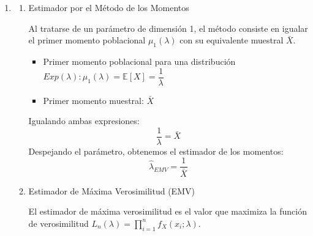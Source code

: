 \begin{enumerate}[label=\color{red}\textbf{\arabic*)}]
\begin{enumerate}[label=\color{red}\textbf{\alph*)}]
\begin{enumerate}[label=\arabic*)]
			                  El error cuadrático medio se define como la función $\mathbb{E}_p[(\hat{p}-p)^2] $. Para facilitar el cálculo, el ECM se puede descomponer como $\mathrm{Var}(\hat{p})+[\mathrm{sesgo}(\hat{p})]^2$.

			                  Como acabamos de Demostrar que el sesgo es 0: \[
				                  ECM(\hat{p})=\mathrm{Var}(\hat{p})=\mathrm{Var}(\bar{X})
			                  \]
			                  Desarrollamos la varianza: \[
				                  \mathrm{Var}(\bar{X})=\mathrm{Var}\left( \dfrac{1}{n} \sum_{i=1}^{n} X_i \right) =\dfrac{1}{n^2} \sum_{i=1}^{n} \mathrm{Var}(X_i)
			                  \]
			                  La varianza poblacional de una distribución de Bernoulli es $p(1-p)$. Sustituyendo este valor: \[
				                  ECM(\hat{p})=\dfrac{1}{n^2}(n\cdot p(1-p))=\dfrac{p(1-p)}{n}
			                  \]
		            \end{enumerate}
	      \end{enumerate}
	\item {}
	      \begin{enumerate}[label=\arabic*)]
		      \item Estimador por el Método de los Momentos

		            Al tratarse de un parámetro de dimensión 1, el método consiste en igualar el primer momento poblacional $\mu_1(\lambda)$ con su equivalente muestral $\bar{X}$.
		            \begin{itemize}[label=\textbullet]
			            \item Primer momento poblacional para una distribución $Exp(\lambda):\mu_1(\lambda)=\mathbb{E}[X]=\dfrac{1}{\lambda}$
			            \item Primer momento muestral: $\bar{X}$
		            \end{itemize}
		            Igualando ambas expresiones: \[
			            \dfrac{1}{\lambda}=\bar{X}
		            \]
		            Despejando el parámetro, obtenemos el estimador de los momentos: \[
			            \hat{\lambda}_{EMV}=\dfrac{1}{\bar{X}}
		            \]
		      \item Estimador de Máxima Verosimilitud (EMV)

		            El estimador de máxima verosimilitud es el valor que maximiza la función de verosimilitud $L_n(\lambda)=\prod_{i=1}^{n} f_X(x_i;\lambda).$


\end{enumerate}
\end{enumerate}
